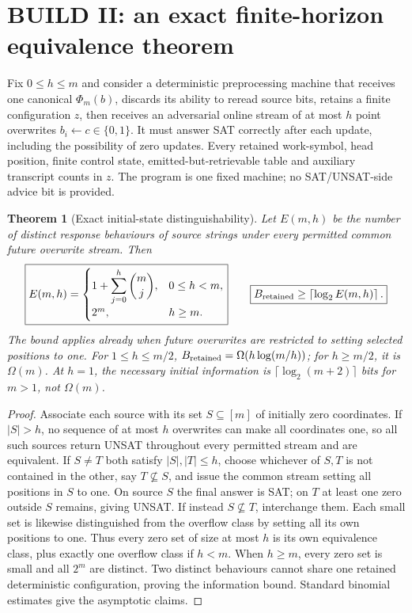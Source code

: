 \documentclass[11pt]{article}
\newtheorem{theorem}{Theorem}
\begin{document}
\section{BUILD II: an exact finite-horizon equivalence theorem}
Fix $0\le h\le m$ and consider a deterministic preprocessing machine that receives one canonical $\Phi_m(b)$, discards its ability to reread source bits, retains a finite configuration $z$, then receives an adversarial online stream of at most $h$ point overwrites $b_i\gets c\in\{0,1\}$. It must answer SAT correctly after each update, including the possibility of zero updates. Every retained work-symbol, head position, finite control state, emitted-but-retrievable table and auxiliary transcript counts in $z$. The program is one fixed machine; no SAT/UNSAT-side advice bit is provided.

\begin{theorem}[Exact initial-state distinguishability]\label{thm:classes}
Let $E(m,h)$ be the number of distinct response behaviours of source strings under every permitted common future overwrite stream. Then
\[
 \boxed{ E(m,h)=\begin{cases}1+\displaystyle\sum_{j=0}^{h}\binom{m}{j},&0\le h<m,\\2^m,&h\ge m.\end{cases}}
 \qquad\boxed{B_{\rm retained}\ge\left\lceil\log_2 E(m,h)\right\rceil.}
\]
The bound applies already when future overwrites are restricted to setting selected positions to one. For $1\le h\le m/2$, $B_{\rm retained}=\Omega(h\log(m/h))$; for $h\ge m/2$, it is $\Omega(m)$. At $h=1$, the necessary initial information is $\lceil\log_2(m+2)\rceil$ bits for $m>1$, not $\Omega(m)$.
\end{theorem}
\begin{proof}
Associate each source with its set $S\subseteq[m]$ of initially zero coordinates. If $|S|>h$, no sequence of at most $h$ overwrites can make all coordinates one, so all such sources return UNSAT throughout every permitted stream and are equivalent. If $S\ne T$ both satisfy $|S|,|T|\le h$, choose whichever of $S,T$ is not contained in the other, say $T\nsubseteq S$, and issue the common stream setting all positions in $S$ to one. On source $S$ the final answer is SAT; on $T$ at least one zero outside $S$ remains, giving UNSAT. If instead $S\nsubseteq T$, interchange them. Each small set is likewise distinguished from the overflow class by setting all its own positions to one. Thus every zero set of size at most $h$ is its own equivalence class, plus exactly one overflow class if $h<m$. When $h\ge m$, every zero set is small and all $2^m$ are distinct. Two distinct behaviours cannot share one retained deterministic configuration, proving the information bound. Standard binomial estimates give the asymptotic claims.
\end{proof}
\end{document}
